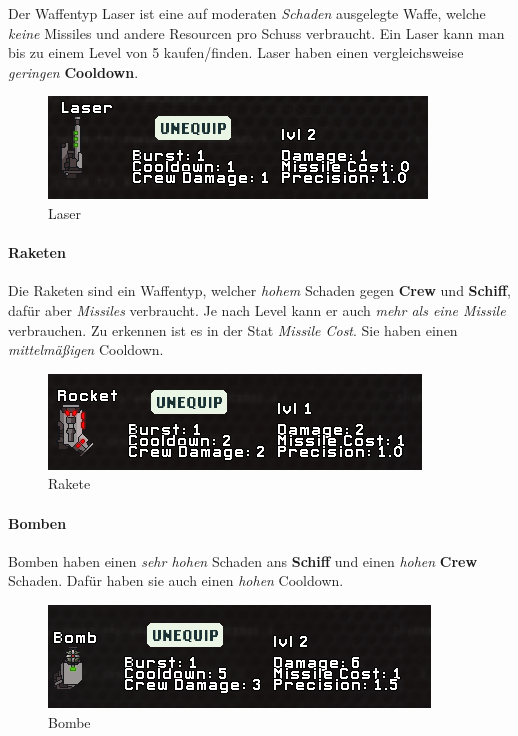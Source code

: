 \documentclass[fontsize=12pt,paper=a4,twoside]{scrartcl}
\begin{document}
Der Waffentyp Laser ist eine auf moderaten \textit{Schaden} ausgelegte Waffe, welche \textit{keine} Missiles und andere Resourcen pro Schuss verbraucht. Ein Laser kann man bis zu einem Level von 5 kaufen/finden. Laser haben einen vergleichsweise \textit{geringen} \textbf{Cooldown}. 


\begin{figure}[H]
\centering
\includegraphics[width=1\linewidth]{DasSpiel/Kampf/waffen/laser.png}
\caption{Laser}
\end{figure}


\paragraph{Raketen}

Die Raketen sind ein Waffentyp, welcher \textit{hohem} Schaden gegen \textbf{Crew} und \textbf{Schiff}, dafür aber \textit{Missiles} verbraucht. Je nach Level kann er auch \textit{mehr als eine Missile} verbrauchen. Zu erkennen ist es in der Stat \textit{Missile Cost}. Sie haben einen \textit{mittelmäßigen} Cooldown.

\begin{figure}[H]
\centering
\includegraphics[width=1\linewidth]{DasSpiel/Kampf/waffen/rakete.png}
\caption{Rakete}
\end{figure}

\paragraph{Bomben}

Bomben haben einen \textit{sehr hohen} Schaden ans \textbf{Schiff} und einen \textit{hohen} \textbf{Crew} Schaden. Dafür haben sie auch einen \textit{hohen} Cooldown. 

\begin{figure}[H]
\centering
\includegraphics[width=1\linewidth]{DasSpiel/Kampf/waffen/bomb.png}
\caption{Bombe}
\end{figure}
\end{document}
